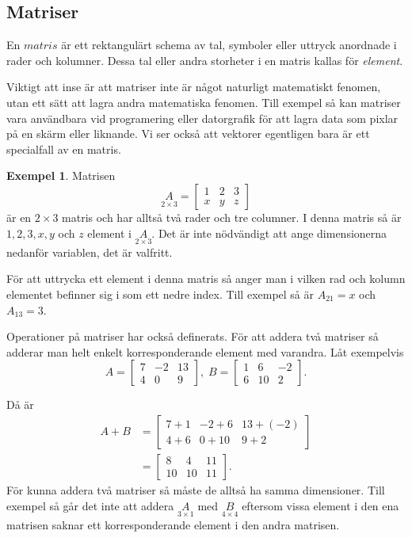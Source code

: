 \documentclass{article}
\theoremstyle{definition}
\newtheorem{exmp}[thm]{Exempel}
\begin{document}
\subsection{Matriser}
\begin{mydef}{}{}
  En $matris$ är ett rektangulärt schema av tal, symboler eller uttryck anordnade i rader och kolumner. 
  Dessa tal eller andra storheter i en matris kallas för \textit{element}.  
\end{mydef}
Viktigt att inse är att 
matriser inte är något naturligt matematiskt fenomen, 
utan ett sätt att lagra andra matematiska fenomen.
Till exempel så kan matriser vara användbara vid programering eller datorgrafik för att lagra data som 
pixlar på en skärm eller liknande. Vi ser också att vektorer egentligen bara är ett specialfall av en 
matris.
\begin{exmp}
Matrisen
\[ \underset{2 \times 3}{A} = 
  \begin{bmatrix}
    1 & 2 & 3 \\
    x & y & z
  \end{bmatrix}
\]
är en $2 \times 3$ matris och har alltså två rader och tre columner.
I denna matris så är $1, 2, 3, x, y$ och $z$ element i $\underset{2 \times 3}{A}.$
Det är inte nödvändigt att ange dimensionerna nedanför variablen, det är valfritt. 

För att uttrycka ett element i denna matris så anger man i vilken rad och kolumn 
elementet befinner sig i som ett nedre index. Till exempel så är 
$A_{21} = x$ och $A_{13} = 3$.
\end{exmp}

Operationer på matriser har också definerats. För att addera två matriser så adderar man helt enkelt korresponderande element med varandra. 
Låt exempelvis 
\[ A = 
  \begin{bmatrix}
    7 & -2 & 13 \\
    4 & 0 & 9
  \end{bmatrix}, \;
  B = 
  \begin{bmatrix}
    1 & 6 & -2 \\
    6 & 10 & 2
  \end{bmatrix}.
\]

Då är 
\begin{align*}
  A + B & =
  \begin{bmatrix}
    7 + 1 & -2 + 6 & 13 + (-2) \\
    4 + 6 & 0 + 10 & 9 + 2
  \end{bmatrix} \\
  & = 
  \begin{bmatrix}
    8 & 4 & 11 \\
    10 & 10 & 11
  \end{bmatrix}.
\end{align*}
För kunna addera två matriser så måste de alltså ha samma 
dimensioner. Till exempel så går det inte att 
addera $\underset{3 \times 1}{A}$ med $\underset{4 \times 4}{B}$ eftersom vissa element i den ena matrisen saknar ett korresponderande element i den andra matrisen.
\end{document}
